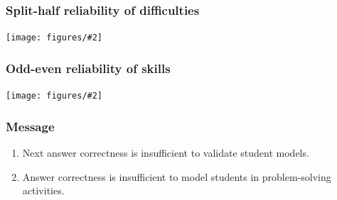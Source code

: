 \documentclass[bigger]{beamer}
\newcommand{\img}[2]{
  \begin{center}
    \texttt{[image: figures/\#2]}
  \end{center}
}
\begin{document}
\begin{frame}
  \frametitle{Split-half reliability of difficulties}
  \bigskip
  \img{0.9}{reliability-difficulties}
\end{frame}


\begin{frame}
  \frametitle{Odd-even reliability of skills}
  \bigskip
  \img{0.9}{reliability-skills}
\end{frame}


\begin{frame}
\frametitle{Message}
\begin{enumerate}
\item Next answer correctness is insufficient to validate student models.
\item Answer correctness is insufficient to model students in problem-solving activities.
\end{enumerate}
\end{frame}
\end{document}
